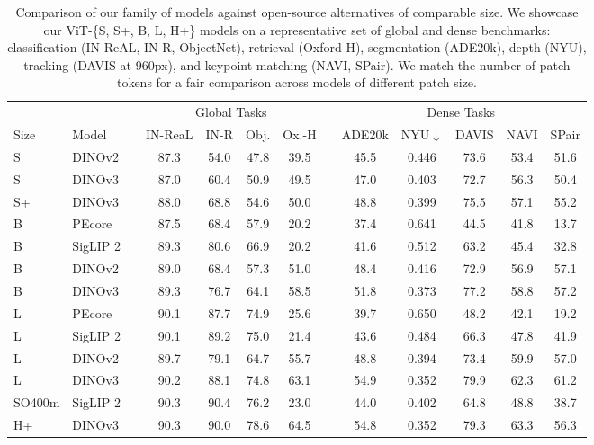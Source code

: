 \begin{table}[t]
  \centering
  \small
  \caption{
    Comparison of our family of models against open-source alternatives of comparable size.
    We showcase our ViT-\{S, S+, B, L, H+\} models on a representative set of global and dense benchmarks: classification (IN-ReAL, IN-R, ObjectNet), retrieval (Oxford-H), segmentation (ADE20k), depth (NYU), tracking (DAVIS at 960px), and keypoint matching (NAVI, SPair).
    We match the number of patch tokens for a fair comparison across models of different patch size.
  }
  \label{tab:family:distillation}
  \begin{tabular}{@{}llc cccc c ccccc@{}}
    \toprule
    & && \multicolumn{4}{c}{Global Tasks} && \multicolumn{5}{c}{Dense Tasks} \\
    \cmidrule{4-7} \cmidrule{9-13}
    Size & Model && IN-ReaL & IN-R & Obj. & Ox.-H && ADE20k  & NYU$\downarrow$ & DAVIS & NAVI & SPair \\
    \midrule
    S & DINOv2  && 87.3 & 54.0 & 47.8 & 39.5 && 45.5 & 0.446 & 73.6 & 53.4 & 51.6 \\
    S & DINOv3  && 87.0 & 60.4 & 50.9 & 49.5 && 47.0 & 0.403 & 72.7 & 56.3 & 50.4 \\
    S+ & DINOv3 && 88.0 & 68.8 & 54.6 & 50.0 && 48.8 & 0.399 & 75.5 & 57.1 & 55.2 \\  
    \midrule
    B & PEcore && 87.5 & 68.4 & 57.9 & 20.2 && 37.4 & 0.641 & 44.5 & 41.8 & 13.7 \\ 
    B & SigLIP 2 && 89.3 & 80.6 & 66.9 & 20.2 && 41.6 & 0.512 & 63.2 & 45.4 & 32.8\\
    B & DINOv2  && 89.0 & 68.4 & 57.3 & 51.0 && 48.4 & 0.416 & 72.9 & 56.9 & 57.1 \\
    B & DINOv3  && 89.3 & 76.7 & 64.1 & 58.5 && 51.8 & 0.373 & 77.2 & 58.8 & 57.2 \\ 
    \midrule
    L & PEcore && 90.1 & 87.7 & 74.9 & 25.6 && 39.7 & 0.650 & 48.2 & 42.1 & 19.2 \\
    L & SigLIP 2 && 90.1 & 89.2 & 75.0 & 21.4 && 43.6 & 0.484 & 66.3 & 47.8 & 41.9 \\
    L & DINOv2  && 89.7 & 79.1 & 64.7 & 55.7 && 48.8 & 0.394 & 73.4 & 59.9 & 57.0 \\
    L & DINOv3  && 90.2 & 88.1 & 74.8 & 63.1 && 54.9 & 0.352 & 79.9 & 62.3 & 61.2 \\
    \midrule
    SO400m & SigLIP 2 && 90.3 & 90.4 & 76.2 & 23.0 && 44.0 & 0.402 & 64.8 & 48.8 & 38.7 \\
    \midrule
    H+ & DINOv3 && 90.3 & 90.0 & 78.6 & 64.5 && 54.8 & 0.352 & 79.3 & 63.3 & 56.3 \\ 
    \bottomrule
  \end{tabular}
\end{table}

